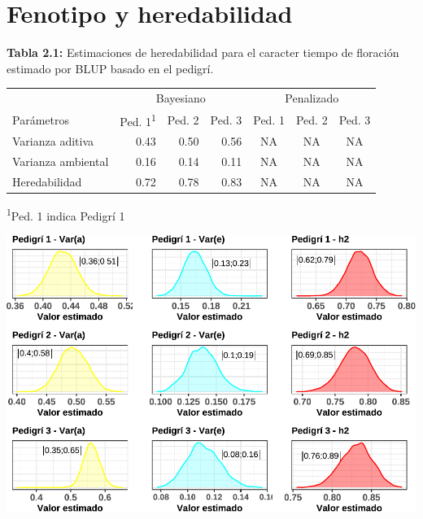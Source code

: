 \documentclass[11pt,spanish,a4paper,oneside,]{book} %
\begin{document}
\hypertarget{results3}{%
\section{Fenotipo y heredabilidad}\label{results3}}

\begin{center}
\textbf{Tabla 2.1:} Estimaciones de heredabilidad para el caracter tiempo de floración estimado por BLUP basado en el pedigrí.

\end{center}

\captionsetup[table]{labelformat=empty,skip=1pt}
\begin{longtable}{lrrrccc}
\toprule
 & \multicolumn{3}{c}{Bayesiano} & \multicolumn{3}{c}{Penalizado} \\ 
 \cmidrule(lr){2-4} \cmidrule(lr){5-7}
Parámetros & Ped. 1\textsuperscript{1} & Ped. 2 & Ped. 3 & Ped. 1 & Ped. 2 & Ped. 3 \\ 
\midrule
Varianza aditiva & 0.43 & 0.50 & 0.56 & NA & NA & NA \\ 
Varianza ambiental & 0.16 & 0.14 & 0.11 & NA & NA & NA \\ 
Heredabilidad & 0.72 & 0.78 & 0.83 & NA & NA & NA \\ 
 \bottomrule
\end{longtable}
\vspace{-5mm}
\begin{minipage}{\linewidth}
\textsuperscript{1}Ped. 1 indica Pedigrí 1 \\ 
\end{minipage}

\begin{center}\includegraphics[width=1\linewidth]{figures/covar_h2} \end{center}
\end{document}
